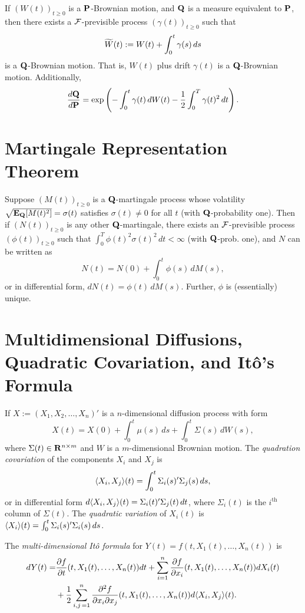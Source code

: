 \documentclass[twocolumn]{amsart}
\begin{document}
If $(W(t))_{t \ge 0}$ is a $\P$-Brownian motion, and $\Q$ is a measure equivalent to $\P$, then there exists a $\F$-previsible process $(\gamma(t))_{t \ge 0}$ such that
\[ \tW(t) := W(t) + \int_0^t \gamma(s)\,ds \]
is a $\Q$-Brownian motion. That is, $W(t)$ plus drift $\gamma(t)$ is a $\Q$-Brownian motion. Additionally,
\[ \frac{d \Q}{d \P} = \exp\left(-\int_0^t \gamma(t)\,dW(t) - \frac{1}{2} \int_0^T \gamma(t)^2\,dt\right).\]

\section*{Martingale Representation Theorem}

Suppose $(M(t))_{t \ge 0}$ is a $\Q$-martingale process whose volatility $\sqrt{\EQ[M(t)^2]} = \sigma(t)$ satisfies $\sigma(t) \ne 0$ for all $t$ (with $\Q$-probability one). Then if $(N(t))_{t \ge 0}$ is any other $\Q$-martingale, there exists an $\F$-previsible process $(\phi(t))_{t \ge 0}$ such that $\int_0^T \phi(t)^2 \sigma(t)^2\,dt < \infty$ (with $\Q$-prob. one), and $N$ can be written as
\[ N(t) = N(0) + \int_0^t \phi(s)\,dM(s), \]
or in differential form, $dN(t) = \phi(t)\,dM(s)$. Further, $\phi$ is (essentially) unique.

\section*{Multidimensional Diffusions, Quadratic Covariation, and It\^o's Formula}

If $X := (X_1, X_2, \ldots, X_n)'$ is a $n$-dimensional diffusion process with form
\begin{equation*}
    X(t) = X(0) + \int_0^t \mu(s)\,ds + \int_0^t \Sigma(s)\,dW(s),
\end{equation*}
where $\Sigma(t) \in \R^{n \times m}$ and $W$ is a $m$-dimensional Brownian motion. The \emph{quadration covariation} of the components $X_i$ and $X_j$ is
\begin{equation*}
    \QV{X_i,X_j}(t) = \int_0^t \Sigma_i(s)' \Sigma_j(s)\,ds,
\end{equation*}
or in differential form $d\QV{X_i,X_j}(t) = \Sigma_i(t)'\Sigma_j(t)\,dt$, where $\Sigma_i(t)$ is the $i^\text{th}$ column of $\Sigma(t)$. The \emph{quadratic variation} of $X_i(t)$ is $\QV{X_i}(t) = \int_0^t \Sigma_i(s)' \Sigma_i(s)\,ds$.

The \emph{multi-dimensional It\^{o} formula} for $Y(t) = f(t, X_1(t), \ldots, X_n(t))$
is
\begin{align*}
    d Y(t) = &\frac{\partial f}{\partial t} (t,X_1(t), \ldots, X_n(t)) dt
            + \sum_{i=1}^n \frac{\partial f}{\partial x_i} (t,X_1(t), \ldots, X_n(t))dX_i(t) \\
            &+ \frac{1}{2}\sum_{i,j\,=1}^n \frac{\partial^2 f}{\partial x_i \partial x_j} (t,X_1(t), \ldots, X_n(t)) d \QV{X_i, X_j}(t).
\end{align*}
\end{document}
